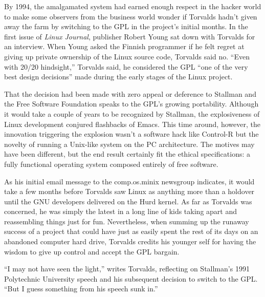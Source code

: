 By 1994, the amalgamated system had earned enough respect in the hacker world to make some observers from the business world wonder if Torvalds hadn't given away the farm by switching to the GPL in the project's initial months. In the first issue of \textit{Linux Journal}, publisher Robert Young sat down with Torvalds for an interview. When Young asked the Finnish programmer if he felt regret at giving up private ownership of the Linux source code, Torvalds said no. ``Even with 20/20 hindsight,'' Torvalds said, he considered the GPL ``one of the very best design decisions'' made during the early stages of the Linux project.

That the decision had been made with zero appeal or deference to Stallman and the Free Software Foundation speaks to the GPL's growing portability. Although it would take a couple of years to be recognized by Stallman, the explosiveness of Linux development conjured flashbacks of Emacs. This time around, however, the innovation triggering the explosion wasn't a software hack like Control-R but the novelty of running a Unix-like system on the PC architecture. The motives may have been different, but the end result certainly fit the ethical specifications: a fully functional operating system composed entirely of free software.

As his initial email message to the comp.os.minix newsgroup indicates, it would take a few months before Torvalds saw Linux as anything more than a holdover until the GNU developers delivered on the Hurd kernel. As far as Torvalds was concerned, he was simply the latest in a long line of kids taking apart and reassembling things just for fun. Nevertheless, when summing up the runaway success of a project that could have just as easily spent the rest of its days on an abandoned computer hard drive, Torvalds credits his younger self for having the wisdom to give up control and accept the GPL bargain.

``I may not have seen the light,'' writes Torvalds, reflecting on Stallman's 1991 Polytechnic University speech and his subsequent decision to switch to the GPL. ``But I guess something from his speech sunk in.''

\theendnotes
\setcounter{endnote}{0}
